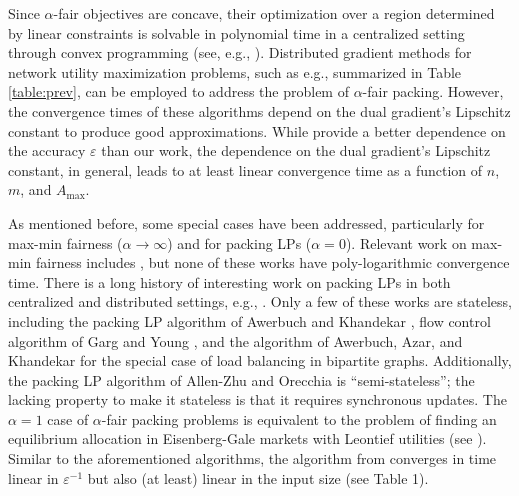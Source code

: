 \documentclass[11pt]{article}
\begin{document}
Since $\alpha$-fair objectives are concave, their optimization over a region determined by linear constraints is solvable in polynomial time in a centralized setting through convex programming (see, e.g., \cite{boyd2009convex, nesterov2004introductory}). Distributed gradient methods for network utility maximization problems, such as e.g., \cite{Beck2014Gradient, mosk2010fully} summarized in Table \ref{table:prev}, can be employed to address the problem of $\alpha$-fair packing. However, the convergence times of these algorithms depend on the dual gradient's Lipschitz constant to produce good approximations. While \cite{Beck2014Gradient, mosk2010fully} provide a better dependence on the accuracy $\varepsilon$ than our work, the dependence on the dual gradient's Lipschitz constant, in general, leads to at least linear convergence time as a function of $n$, $m$, and $A_{\max}$. 

As mentioned before, some special cases have been addressed, particularly for max-min fairness ($\alpha \rightarrow \infty$) and for  packing LPs ($\alpha = 0$). Relevant work on max-min fairness includes \cite{Bertsekas:1987:DN:12517, jaffe1981bottleneck, kumar2000fairness, kleinberg1999fairness, megiddo1974optimal, marasevic2014max,charny1995congestion}, but none of these works have poly-logarithmic convergence time.  
There is a long history of interesting work on packing LPs in both centralized and distributed settings, e.g., \cite{c-allen2015nearly, c-plotkin1995fast, c-koufogiannakis2007beating, c-garg2007faster, AwerbuchKhandekar2009, d-luby1993parallel, d-bartal1997global, dc-young2001sequential, d-kuhn2006price, d-allen2014using, garg2002line}.  Only a few of these works are stateless, including 
 the packing LP algorithm of Awerbuch and Khandekar \cite{AwerbuchKhandekar2009}, flow control algorithm of Garg and Young \cite{garg2002line}, and the algorithm of Awerbuch, Azar, and Khandekar \cite{awerbuch2008fast} for the special case of load balancing in bipartite graphs. Additionally, the packing LP algorithm of Allen-Zhu and Orecchia \cite{d-allen2014using} is ``semi-stateless''; the lacking property to make it stateless is that it requires synchronous updates. 
The $\alpha=1$ case of $\alpha$-fair packing problems is equivalent to the problem of finding an equilibrium allocation in Eisenberg-Gale markets with Leontief utilities (see \cite{cheung2013tatonnement}). Similar to the aforementioned algorithms, the algorithm from \cite{cheung2013tatonnement} converges in time linear in $\varepsilon^{-1}$ but also (at least) linear in the input size (see Table 1).
\end{document}

